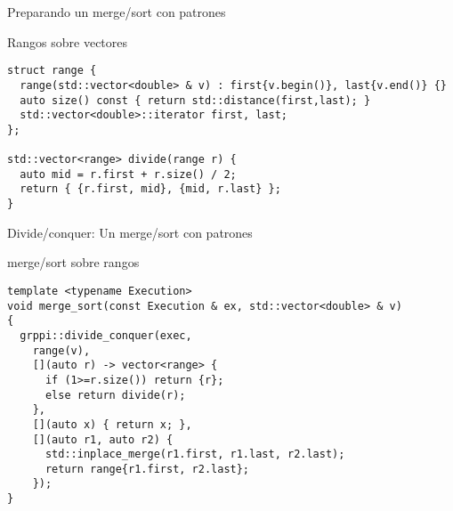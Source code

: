 \begin{frame}[t,fragile]{Preparando un merge/sort con patrones}
\begin{block}{Rangos sobre vectores}
\begin{lstlisting}
struct range {
  range(std::vector<double> & v) : first{v.begin()}, last{v.end()} {}
  auto size() const { return std::distance(first,last); }
  std::vector<double>::iterator first, last;
};

std::vector<range> divide(range r) {
  auto mid = r.first + r.size() / 2;
  return { {r.first, mid}, {mid, r.last} };
}
\end{lstlisting}
\end{block}
\end{frame}

\begin{frame}[t,fragile]{Divide/conquer: Un merge/sort con patrones}
\begin{block}{merge/sort sobre rangos}
\begin{lstlisting}
template <typename Execution>
void merge_sort(const Execution & ex, std::vector<double> & v)
{
  grppi::divide_conquer(exec,
    range(v),
    [](auto r) -> vector<range> {
      if (1>=r.size()) return {r};
      else return divide(r);
    },
    [](auto x) { return x; },
    [](auto r1, auto r2) {
      std::inplace_merge(r1.first, r1.last, r2.last);
      return range{r1.first, r2.last};
    });
}
\end{lstlisting}
\end{block}
\end{frame}
